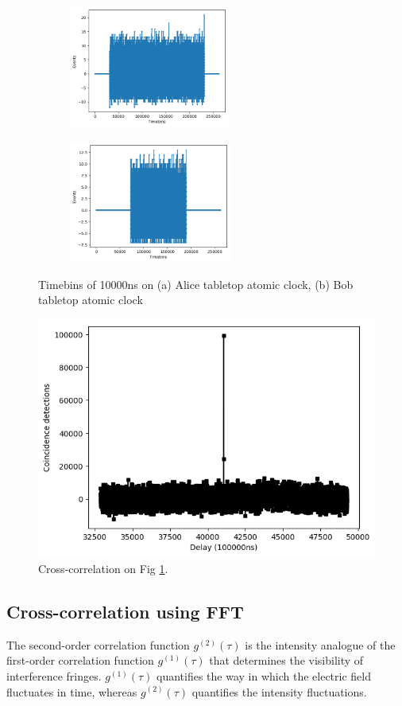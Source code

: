 \begin{figure}[ht!]
	\centering
	\begin{subfigure}[t]{0.49\linewidth}
		\centering
		\includegraphics[height=4cm]{assets/aliceBobTimebinAlice.png}
		\subcaption{}
	\end{subfigure}
	\begin{subfigure}[t]{0.49\textwidth}
		\centering
		\includegraphics[height=4cm]{assets/aliceBobTimebinBob.png}
		\subcaption{}
	\end{subfigure}
	\caption{Timebins of 10000ns on (a) Alice tabletop atomic clock, (b) Bob tabletop atomic clock}
	\label{fig:timebins}
\end{figure}

\begin{figure}[ht!]
	\includegraphics[width=0.97\linewidth]{assets/aliceBob_cc}
	\caption{Cross-correlation on Fig \ref{fig:timebins}.}
	\label{fig:cc_bin}
\end{figure}

\subsection{Cross-correlation using FFT}

The second-order correlation function $g^{(2)}(\tau)$ is the intensity analogue of the first-order correlation function $g^{(1)}(\tau)$ that determines the visibility of interference fringes. $g^{(1)}(\tau)$ quantifies the way in which the electric field fluctuates in time, whereas $g^{(2)}(\tau)$ quantifies the intensity fluctuations.